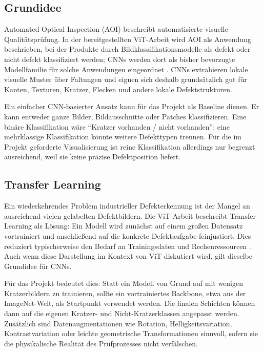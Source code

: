 \documentclass[11pt,a4paper]{article}
\begin{document}
\subsection{Grundidee}

Automated Optical Inspection (AOI) beschreibt automatisierte visuelle Qualitätsprüfung. In der bereitgestellten ViT-Arbeit wird AOI als Anwendung beschrieben, bei der Produkte durch Bildklassifikationsmodelle als defekt oder nicht defekt klassifiziert werden; CNNs werden dort als bisher bevorzugte Modellfamilie für solche Anwendungen eingeordnet \cite{vit_thesis}. CNNs extrahieren lokale visuelle Muster über Faltungen und eignen sich deshalb grundsätzlich gut für Kanten, Texturen, Kratzer, Flecken und andere lokale Defektstrukturen.

Ein einfacher CNN-basierter Ansatz kann für das Projekt als Baseline dienen. Er kann entweder ganze Bilder, Bildausschnitte oder Patches klassifizieren. Eine binäre Klassifikation wäre \enquote{Kratzer vorhanden / nicht vorhanden}; eine mehrklassige Klassifikation könnte weitere Defekttypen trennen. Für die im Projekt geforderte Visualisierung ist reine Klassifikation allerdings nur begrenzt ausreichend, weil sie keine präzise Defektposition liefert.

\subsection{Transfer Learning}

Ein wiederkehrendes Problem industrieller Defekterkennung ist der Mangel an ausreichend vielen gelabelten Defektbildern. Die ViT-Arbeit beschreibt Transfer Learning als Lösung: Ein Modell wird zunächst auf einem großen Datensatz vortrainiert und anschließend auf die konkrete Defektaufgabe feinjustiert. Dies reduziert typischerweise den Bedarf an Trainingsdaten und Rechenressourcen \cite{vit_thesis}. Auch wenn diese Darstellung im Kontext von ViT diskutiert wird, gilt dieselbe Grundidee für CNNs.

Für das Projekt bedeutet dies: Statt ein Modell von Grund auf mit wenigen Kratzerbildern zu trainieren, sollte ein vortrainiertes Backbone, etwa aus der ImageNet-Welt, als Startpunkt verwendet werden. Die finalen Schichten können dann auf die eigenen Kratzer- und Nicht-Kratzerklassen angepasst werden. Zusätzlich sind Datenaugmentationen wie Rotation, Helligkeitsvariation, Kontrastvariation oder leichte geometrische Transformationen sinnvoll, sofern sie die physikalische Realität des Prüfprozesses nicht verfälschen.
\end{document}
